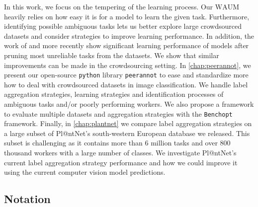 In this work, we focus on the tempering of the learning process.
Our $\mathrm{WAUM}$ heavily relies on how easy it is for a model to learn the given task.
Furthermore, identifying possible ambiguous tasks lets us better explore large crowdsourced datasets and consider strategies to improve learning performance.
In addition, the work of \citet{merler2004bias} and more recently \citet{pleiss_identifying_2020} show significant learning performance of models after pruning most unreliable tasks from the datasets.
We show that similar improvements can be made in the crowdsourcing setting.
In \cref{chap:peerannot}, we present our open-source \texttt{python} library \texttt{peerannot} to ease and standardize more how to deal with crowdsourced datasets in image classification.
We handle label aggregation strategies, learning strategies and identification processes of ambiguous tasks and/or poorly performing workers.
We also propose a framework to evaluate multiple datasets and aggregation strategies with the \texttt{Benchopt} framework.
Finally, in \cref{chap:plantnet} we compare label aggregation strategies on a large subset of Pl@ntNet's south-western European database we released.
This subset is challenging as it contains more than $6$ million tasks and over $800$ thousand workers with a large number of classes.
We investigate Pl@ntNet's current label aggregation strategy performance and how we could improve it using the current computer vision model predictions.

\subsection{Notation}

